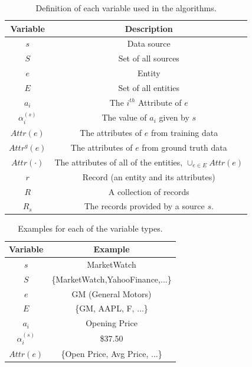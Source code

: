 \documentclass{acm_proc_article-sp}
\begin{document}
\begin{table}
\centering
\begin{tabular}{|c|c|}
\hline
Variable & Description  \\
\hline
$s$ & Data source \\
$S$ & Set of all sources  \\
$e$ & Entity \\
$E$ & Set of all entities \\
$a_i$ & The $i^{th}$ Attribute of $e$ \\
$\alpha_i^{(s)}$ & The value of $a_i$ given by $s$ \\
$Attr(e)$ & The attributes of $e$ from training data\\
$Attr^g(e)$ & The attributes of $e$ from ground truth data\\
$Attr(\cdot)$ & The attributes of all of the entities, $\cup_{e \in E} Attr(e)$ \\
$r$ & Record (an entity and its attributes) \\
$R$ & A collection of records \\
$R_s$ & The records provided by a source $s$. \\
\hline
\end{tabular}
\caption{Definition of each variable used in the algorithms.}
\label{tbl:vars}
\end{table}

\begin{table}
\centering
\begin{tabular}{|c|c|}
\hline
Variable & Example \\
\hline
$s$  & MarketWatch \\
$S$ & \{MarketWatch,YahooFinance,$\dots$\}  \\
$e$ & GM (General Motors) \\
$E$ & \{GM, AAPL, F, $\dots$\} \\
$a_i$ & Opening Price \\
$\alpha_i^{(s)}$ & \$37.50 \\
$Attr(e)$ & \{Open Price, Avg Price, $\dots$\} \\
\hline
\end{tabular}
\caption{Examples for each of the variable types.}
\label{tbl:varExs}
\end{table}
\end{document}
